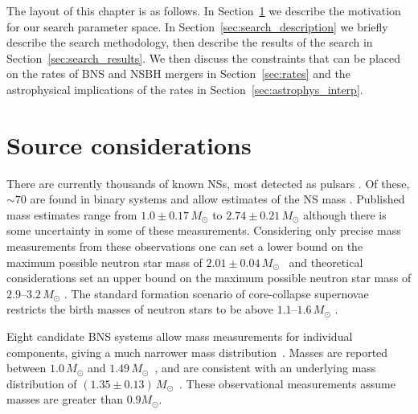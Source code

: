 The layout of this chapter is as follows. In Section~\ref{sec:source_considerations} we describe
the motivation for our search parameter space. In Section~\ref{sec:search_description} we briefly
describe the search methodology, then describe the results of the search in Section~\ref{sec:search_results}.
We then discuss the constraints that can be placed on the rates of \ac{BNS} and \ac{NSBH} mergers in Section~\ref{sec:rates}
and the astrophysical implications of the rates in Section~\ref{sec:astrophys_interp}.

\section{Source considerations}
\label{sec:source_considerations}

There are currently thousands of known NSs, most detected as pulsars
\citep{pulsarcat,Manchester:2004bp}. Of these, $\sim70$ are found in binary
systems and allow estimates of the NS mass
\citep{nsmassespage,Lattimer:2012nd,Ozel:2016oaf}.
Published mass estimates range from $1.0\pm0.17\,{M_{\odot}}$ \citep{Falanga:2015mra} to
$2.74\pm0.21\,{{M_{\odot}}}$ \citep{Freire:2007jd} although there is some uncertainty
in some of these measurements.
Considering only precise mass measurements from these observations one can set a lower bound
on the maximum possible neutron star mass of $2.01\pm 0.04\,{M_{\odot}}$~\citep{Antoniadis:2013pzd} and theoretical considerations
set an upper bound on the maximum possible neutron star mass of $2.9$--$3.2\,{M_{\odot}}$ \citep{Rhoades:1974fn,Kalogera:1996ci}.
The standard formation scenario of core-collapse supernovae restricts the birth
masses of neutron stars to be above $1.1$--$1.6\,{M_{\odot}}$
\citep{Ozel:2012ax,Lattimer:2012nd,Kiziltan:2013oja}.

Eight candidate \ac{BNS} systems allow mass measurements for individual
components, giving a much narrower mass distribution~\citep{Lorimer:2008se}. Masses are
reported between $1.0\,{{M_{\odot}}}$ and
$1.49\,{{M_{\odot}}}$~\citep{nsmassespage,Ozel:2016oaf}, and are consistent with an
underlying mass distribution of $(1.35 \pm
0.13)\,{{M_{\odot}}}$~\citep{Kiziltan:2010ct}.
These observational measurements assume masses are greater than $0.9{{M_{\odot}}}$.

